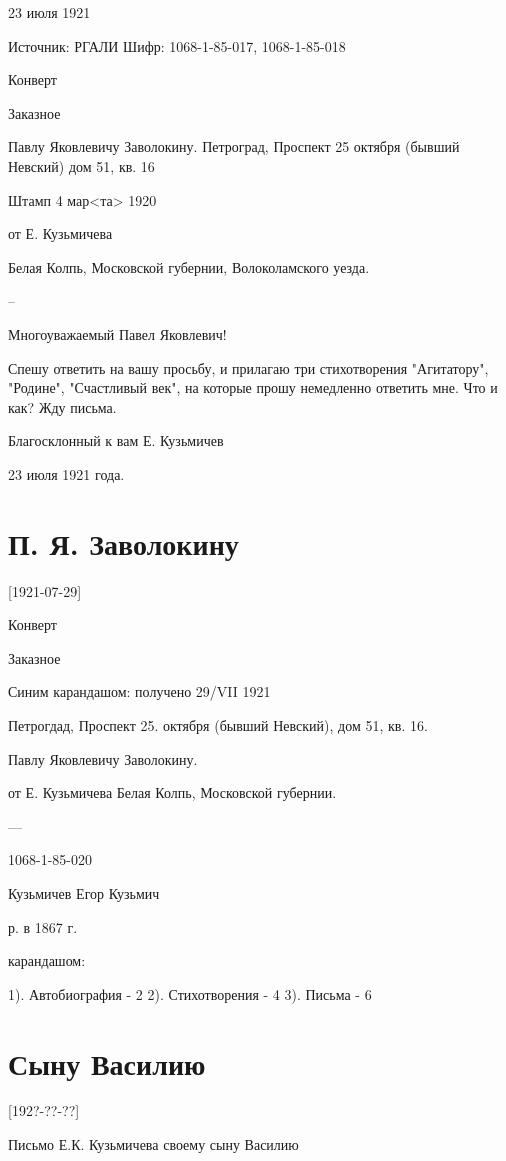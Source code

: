 \documentclass[]{memoir}
\begin{document}
23 июля 1921

Источник: РГАЛИ
Шифр: 1068-1-85-017, 1068-1-85-018

Конверт

Заказное

Павлу Яковлевичу Заволокину.
Петроград, Проспект 25 октября (бывший Невский) дом 51, кв. 16

Штамп 4 мар<та> 1920

от Е. Кузьмичева

Белая Колпь, Московской губернии, Волоколамского уезда.

--

Многоуважаемый Павел Яковлевич!

Спешу ответить на вашу просьбу, и прилагаю три стихотворения "Агитатору", "Родине", "Счастливый век", на которые прошу немедленно ответить мне. Что и как? Жду письма.

Благосклонный к вам Е. Кузьмичев

23 июля 1921 года.


\section{П. Я. Заволокину}
[1921-07-29]

Конверт

Заказное

Синим карандашом: получено 29/VII 1921

Петрогдад, Проспект 25. октября (бывший Невский), дом 51, кв. 16.

Павлу Яковлевичу Заволокину.

от Е. Кузьмичева
Белая Колпь, Московской губернии.

---

1068-1-85-020

Кузьмичев Егор Кузьмич

р. в 1867 г.

карандашом: 

1). Автобиография - 2
2). Стихотворения - 4
3). Письма - 6 





\section{Сыну Василию}

[192?-??-??]
        
Письмо Е.К. Кузьмичева своему сыну Василию
\end{document}
